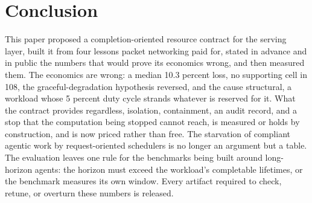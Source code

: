 \section{Conclusion}

This paper proposed a completion-oriented resource contract for the
serving layer, built it from four lessons packet networking paid for,
stated in advance and in public the numbers that would prove its
economics wrong, and then measured them. The economics are wrong: a
median 10.3 percent loss, no supporting cell in 108, the
graceful-degradation hypothesis reversed, and the cause structural, a
workload whose 5 percent duty cycle strands whatever is reserved for
it. What the contract provides regardless, isolation, containment, an
audit record, and a stop that the computation being stopped cannot
reach, is measured or holds by construction, and is now priced rather
than free. The starvation of compliant agentic work by request-oriented
schedulers is no longer an argument but a table. The evaluation leaves
one rule for the benchmarks being built around long-horizon agents: the
horizon must exceed the workload's completable lifetimes, or the
benchmark measures its own window. Every artifact required to check,
retune, or overturn these numbers is released.

